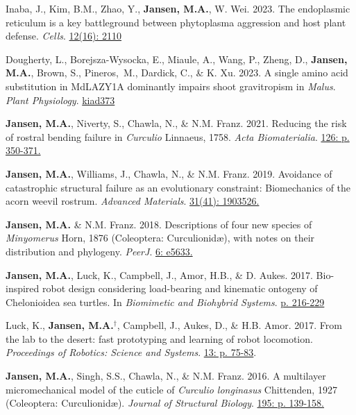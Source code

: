 \documentclass[12pt,a4paper]{article}
\begin{document}
\begin{description}
	\item Inaba, J., Kim, B.M., Zhao, Y., \textbf{Jansen, M.A.}, W. Wei. 2023. The endoplasmic reticulum is a key battleground between phytoplasma aggression and host plant defense. \textit{Cells}. \href{https://doi.org/10.3390/cells12162110}{12(16): 2110}
	
	\item Dougherty, L., Borejsza-Wysocka, E., Miaule, A., Wang, P., Zheng, D., \textbf{Jansen, M.A.}, Brown, S., Pineros,~M., Dardick, C., \& K. Xu. 2023. A single amino acid substitution in MdLAZY1A dominantly impairs shoot gravitropism in \textit{Malus}. \textit{Plant Physiology}. \href{https://doi.org/10.1093/plphys/kiad373}{kiad373}
	
	\item \textbf{Jansen, M.A.}, Niverty, S., Chawla, N., \& N.M. Franz. 2021. Reducing the risk of rostral bending failure in \textit{Curculio} Linnaeus, 1758. \textit{Acta Biomaterialia}. \href{https://doi.org/10.1016/j.actbio.2021.03.029}{126: p. 350-371.}
	
	\item \textbf{Jansen, M.A.}, Williams, J., Chawla, N., \& N.M. Franz. 2019. Avoidance of catastrophic structural failure as an evolutionary constraint: Biomechanics of the acorn weevil rostrum. \textit{Advanced Materials}. \href{https://doi.org/10.1002/adma.201903526}{31(41): 1903526.}
	
	\item \textbf{Jansen, M.A.} \& N.M. Franz. 2018. Descriptions of four new species of \textit{Minyomerus} Horn, 1876 (Coleoptera: Curculionid\ae), with notes on their distribution and phylogeny. \textit{PeerJ}. \href{https://peerj.com/articles/5633/}{6: e5633.}
	
	\item \textbf{Jansen, M.A.}, Luck, K., Campbell, J., Amor, H.B., \& D. Aukes. 2017. Bio-inspired robot design considering load-bearing and kinematic ontogeny of Chelonioidea sea turtles. In \textit{Biomimetic and Biohybrid Systems}. \href{http://www.springer.com/us/book/9783319635361}{p. 216-229}
	
	\item Luck, K., \textbf{Jansen, M.A.}$^\dagger$, Campbell, J., Aukes, D., \& H.B. Amor. 2017. From the lab to the desert: fast prototyping and learning of robot locomotion. \textit{Proceedings of Robotics: Science and Systems}. \href{http://www.roboticsproceedings.org/rss13/p75.html}{13: p. 75-83}.
	
	\item \textbf{Jansen, M.A.}, Singh, S.S., Chawla, N., \& N.M. Franz. 2016. A multilayer micromechanical model of the cuticle of \textit{Curculio longinasus} Chittenden, 1927 (Coleoptera: Curculionid\ae). \textit{Journal of Structural Biology}. \href{http://www.sciencedirect.com/science/article/pii/S1047847716300922}{195: p. 139-158.}
	

\end{description}
\end{document}
